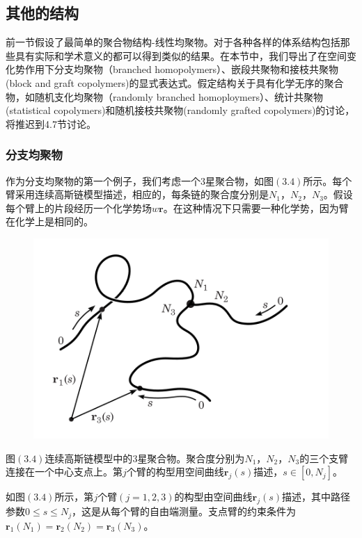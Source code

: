 \subsection{其他的结构}
前一节假设了最简单的聚合物结构-线性均聚物。对于各种各样的体系结构包括那些具有实际和学术意义的都可以得到类似的结果。在本节中，我们导出了在空间变化势作用下分支均聚物（branched homopolymers）、嵌段共聚物和接枝共聚物(block and graft copolymers)的显式表达式。假定结构关于具有化学无序的聚合物，如随机支化均聚物（randomly branched homoploymers）、统计共聚物(statistical copolymers)和随机接枝共聚物(randomly grafted copolymers)的讨论，将推迟到4.7节讨论。
\subsubsection{分支均聚物}
作为分支均聚物的第一个例子，我们考虑一个$3$星聚合物，如图$(3.4)$所示。每个臂采用连续高斯链模型描述，相应的，每条链的聚合度分别是$N_1$，$N_2$，$N_3$。假设每个臂上的片段经历一个化学势场$w \mathbf{r}$。在这种情况下只需要一种化学势，因为臂在化学上是相同的。
\begin{figure}[H]
\centering
\includegraphics[scale=0.7]{./figures/34.png}
\caption{}
\end{figure}
图$(3.4)$连续高斯链模型中的$3$星聚合物。聚合度分别为$N_1$，$N_2$，$N_3$的三个支臂连接在一个中心支点上。第$j$个臂的构型用空间曲线$\mathbf{r}_j(s)$描述，$s\in [0,N_j]$。

如图$(3.4)$所示，第$j$个臂$(j=1,2,3)$的构型由空间曲线$\mathbf{r}_j(s)$描述，其中路径参数$0\leq s\leq N_j$，这是从每个臂的自由端测量。支点臂的约束条件为$\mathbf{r}_1(N_1)=\mathbf{r}_2(N_2)=\mathbf{r}_3(N_3)$。

